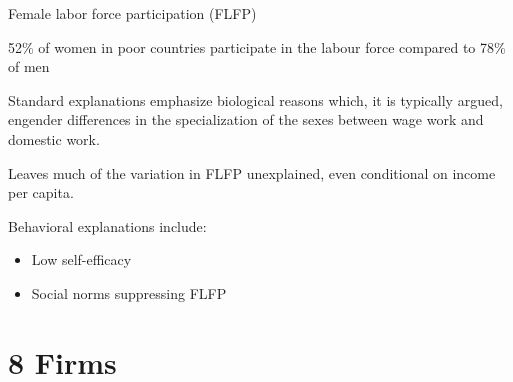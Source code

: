 \documentclass[aspectratio=169, 10pt, handout]{beamer}
\newenvironment{wideitemize}{\itemize\addtolength{\itemsep}{10pt}}{\enditemize}
\begin{document}
\begin{frame}{Female labor force participation (FLFP)}

\begin{wideitemize}

	\item 52\% of women in poor countries participate in the labour force compared to 78\% of men \citep{duflo2012incentives}

	\item Standard explanations emphasize biological reasons which, it is typically argued, engender differences in the specialization of the sexes between wage work and domestic work.

	\item Leaves much of the variation in FLFP unexplained, even conditional on income per capita.

	\item Behavioral explanations include:

	\begin{itemize}
	
		\item Low self-efficacy \citep{mckelway2018women}
		
		\item Social norms suppressing FLFP \citep{bursztyn2018misperceived}

	\end{itemize}
		
\end{wideitemize}

\end{frame}


\section{8 Firms}
\end{document}
